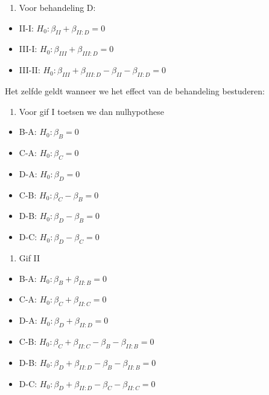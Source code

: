 \documentclass[
  dutch,
  letterpaper,
  12pt]{book}
\providecommand{\tightlist}{%
  \setlength{\itemsep}{0pt}\setlength{\parskip}{0pt}}
\theoremstyle{definition}
\theoremstyle{definition}
\theoremstyle{definition}
\theoremstyle{remark}
\begin{document}
\begin{enumerate}
\def\labelenumi{\arabic{enumi}.}
\setcounter{enumi}{3}
\tightlist
\item
  Voor behandeling D:
\end{enumerate}

\begin{itemize}
\tightlist
\item
  II-I: \(H_0: \beta_{II}+\beta_{II:D}=0\)
\item
  III-I: \(H_0: \beta_{III}+\beta_{III:D}=0\)
\item
  III-II: \(H_0: \beta_{III}+\beta_{III:D}-\beta_{II}-\beta_{II:D}=0\)
\end{itemize}

Het zelfde geldt wanneer we het effect van de behandeling bestuderen:

\begin{enumerate}
\def\labelenumi{\arabic{enumi}.}
\tightlist
\item
  Voor gif I toetsen we dan nulhypothese
\end{enumerate}

\begin{itemize}
\tightlist
\item
  B-A: \(H_0: \beta_{B}=0\)
\item
  C-A: \(H_0: \beta_{C}=0\)
\item
  D-A: \(H_0: \beta_{D}=0\)
\item
  C-B: \(H_0: \beta_{C}-\beta_{B}=0\)
\item
  D-B: \(H_0: \beta_{D}-\beta_{B}=0\)
\item
  D-C: \(H_0: \beta_{D}-\beta_{C}=0\)
\end{itemize}

\begin{enumerate}
\def\labelenumi{\arabic{enumi}.}
\setcounter{enumi}{1}
\tightlist
\item
  Gif II
\end{enumerate}

\begin{itemize}
\tightlist
\item
  B-A: \(H_0: \beta_{B}+\beta_{II:B}=0\)
\item
  C-A: \(H_0: \beta_{C}+\beta_{II:C}=0\)
\item
  D-A: \(H_0: \beta_{D}+\beta_{II:D}=0\)
\item
  C-B: \(H_0: \beta_{C}+\beta_{II:C}-\beta_{B}-\beta_{II:B}=0\)
\item
  D-B: \(H_0: \beta_{D}+\beta_{II:D}-\beta_{B}-\beta_{II:B}=0\)
\item
  D-C: \(H_0: \beta_{D}+\beta_{II:D}-\beta_{C}-\beta_{II:C}=0\)
\end{itemize}
\end{document}
